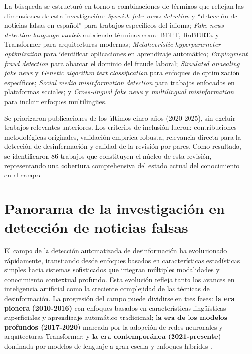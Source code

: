 La búsqueda se estructuró en torno a combinaciones de términos que reflejan las dimensiones de esta investigación: \textit{Spanish fake news detection} y ``detección de noticias falsas en español'' para trabajos específicos del idioma; \textit{Fake news detection language models} cubriendo términos como BERT, RoBERTa y Transformer para arquitecturas modernas; \textit{Metaheuristic hyperparameter optimization} para identificar aplicaciones en aprendizaje automático; \textit{Employment fraud detection} para abarcar el dominio del fraude laboral; \textit{Simulated annealing fake news} y \textit{Genetic algorithm text classification} para enfoques de optimización específicos; \textit{Social media misinformation detection} para trabajos enfocados en plataformas sociales; y \textit{Cross-lingual fake news} y \textit{multilingual misinformation} para incluir enfoques multilingües.

Se priorizaron publicaciones de los últimos cinco años (2020-2025), sin excluir trabajos relevantes anteriores. Los criterios de inclusión fueron: contribuciones metodológicas originales, validación empírica robusta, relevancia directa para la detección de desinformación y calidad de la revisión por pares. Como resultado, se identificaron 86 trabajos que constituyen el núcleo de esta revisión, representando una cobertura comprehensiva del estado actual del conocimiento en el campo.

\section{Panorama de la investigación en detección de noticias falsas}
\label{sec:panorama_investigacion}

El campo de la detección automatizada de desinformación ha evolucionado rápidamente, transitando desde enfoques basados en características estadísticas simples hacia sistemas sofisticados que integran múltiples modalidades y conocimiento contextual profundo. Esta evolución refleja tanto los avances en inteligencia artificial como la creciente complejidad de las técnicas de desinformación. La progresión del campo puede dividirse en tres fases: \textbf{la era pionera (2010-2016)} con enfoques basados en características lingüísticas superficiales y aprendizaje automático tradicional; \textbf{la era de los modelos profundos (2017-2020)} marcada por la adopción de redes neuronales y arquitecturas Transformer; y \textbf{la era contemporánea (2021-presente)} dominada por modelos de lenguaje a gran escala y enfoques híbridos \cite{nature2025rise}.

